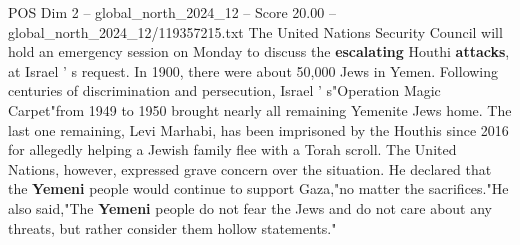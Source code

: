 \begin{textsample}{POS Dim 2 – global\_north\_2024\_12 – Score 20.00 – global\_north\_2024\_12/119357215.txt}
The United Nations Security Council will hold an emergency session on Monday to discuss the \textbf{escalating} Houthi \textbf{attacks}, at Israel ' s request.
In 1900, there were about 50,000 Jews in Yemen.
Following centuries of discrimination and persecution, Israel ' s"Operation Magic Carpet"from 1949 to 1950 brought nearly all remaining Yemenite Jews home.
The last one remaining, Levi Marhabi, has been imprisoned by the Houthis since 2016 for allegedly helping a Jewish family flee with a Torah scroll.
The United Nations, however, expressed grave concern over the situation.
He declared that the \textbf{Yemeni} people would continue to support Gaza,"no matter the sacrifices."He also said,"The \textbf{Yemeni} people do not fear the Jews and do not care about any threats, but rather consider them hollow statements."

\end{textsample}
